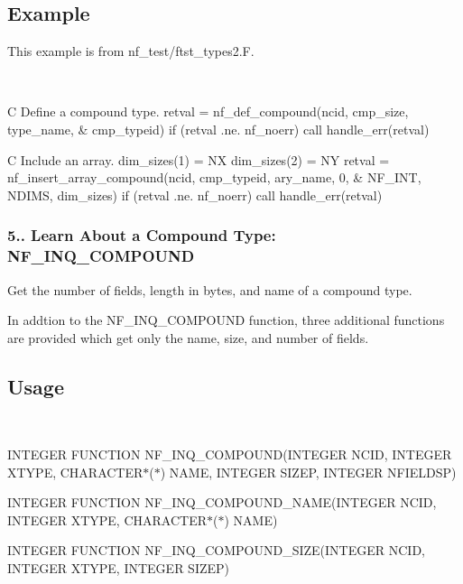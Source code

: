 \subsection*{Example }

This example is from nf\+\_\+test/ftst\+\_\+types2.\+F.

 

C Define a compound type. retval = nf\+\_\+def\+\_\+compound(ncid, cmp\+\_\+size, type\+\_\+name, \& cmp\+\_\+typeid) if (retval .ne. nf\+\_\+noerr) call handle\+\_\+err(retval)

C Include an array. dim\+\_\+sizes(1) = NX dim\+\_\+sizes(2) = NY retval = nf\+\_\+insert\+\_\+array\+\_\+compound(ncid, cmp\+\_\+typeid, ary\+\_\+name, 0, \& N\+F\+\_\+\+I\+NT, N\+D\+I\+MS, dim\+\_\+sizes) if (retval .ne. nf\+\_\+noerr) call handle\+\_\+err(retval)\hypertarget{nc_f77_interface_guide_f77_NF-INQ-COMPOUND}{}\subsubsection{5.. Learn About a Compound Type\+: N\+F\+\_\+\+I\+N\+Q\+\_\+\+C\+O\+M\+P\+O\+U\+ND}\label{nc_f77_interface_guide_f77_NF-INQ-COMPOUND}
Get the number of fields, length in bytes, and name of a compound type.

In addtion to the N\+F\+\_\+\+I\+N\+Q\+\_\+\+C\+O\+M\+P\+O\+U\+ND function, three additional functions are provided which get only the name, size, and number of fields.

\subsection*{Usage }

 

I\+N\+T\+E\+G\+ER F\+U\+N\+C\+T\+I\+ON N\+F\+\_\+\+I\+N\+Q\+\_\+\+C\+O\+M\+P\+O\+U\+ND(I\+N\+T\+E\+G\+ER N\+C\+ID, I\+N\+T\+E\+G\+ER X\+T\+Y\+PE, C\+H\+A\+R\+A\+C\+T\+E\+R$\ast$($\ast$) N\+A\+ME, I\+N\+T\+E\+G\+ER S\+I\+Z\+EP, I\+N\+T\+E\+G\+ER N\+F\+I\+E\+L\+D\+SP)

I\+N\+T\+E\+G\+ER F\+U\+N\+C\+T\+I\+ON N\+F\+\_\+\+I\+N\+Q\+\_\+\+C\+O\+M\+P\+O\+U\+N\+D\+\_\+\+N\+A\+ME(I\+N\+T\+E\+G\+ER N\+C\+ID, I\+N\+T\+E\+G\+ER X\+T\+Y\+PE, C\+H\+A\+R\+A\+C\+T\+E\+R$\ast$($\ast$) N\+A\+ME)

I\+N\+T\+E\+G\+ER F\+U\+N\+C\+T\+I\+ON N\+F\+\_\+\+I\+N\+Q\+\_\+\+C\+O\+M\+P\+O\+U\+N\+D\+\_\+\+S\+I\+ZE(I\+N\+T\+E\+G\+ER N\+C\+ID, I\+N\+T\+E\+G\+ER X\+T\+Y\+PE, I\+N\+T\+E\+G\+ER S\+I\+Z\+EP)


